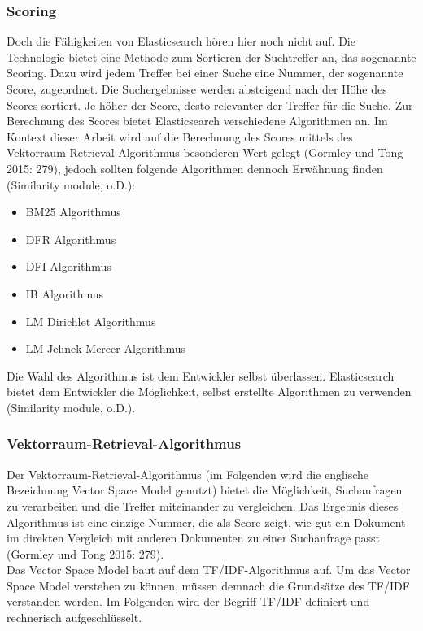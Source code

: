 \documentclass[a4paper]{scrartcl}
\begin{document}
\subsubsection{Scoring}
Doch die Fähigkeiten von Elasticsearch hören hier noch nicht auf. Die Technologie bietet eine Methode zum Sortieren der Suchtreffer an, das sogenannte Scoring. Dazu wird jedem Treffer bei einer Suche eine Nummer, der sogenannte Score, zugeordnet. Die Suchergebnisse werden absteigend nach der Höhe des Scores sortiert. Je höher der Score, desto relevanter der Treffer für die Suche. Zur Berechnung des Scores bietet Elasticsearch verschiedene Algorithmen an. Im Kontext dieser Arbeit wird auf die Berechnung des Scores mittels des Vektorraum-Retrieval-Algorithmus besonderen Wert gelegt (Gormley und Tong 2015: 279), jedoch sollten folgende Algorithmen dennoch Erwähnung finden (Similarity module, o.D.):

\begin{itemize}
	\item BM25 Algorithmus
	\item DFR Algorithmus
	\item DFI Algorithmus
	\item IB Algorithmus
	\item LM Dirichlet Algorithmus
	\item LM Jelinek Mercer Algorithmus
\end{itemize}

Die Wahl des Algorithmus ist dem Entwickler selbst überlassen. Elasticsearch bietet dem Entwickler die Möglichkeit, selbst erstellte Algorithmen zu verwenden (Similarity module, o.D.).

\subsubsection{Vektorraum-Retrieval-Algorithmus}
Der Vektorraum-Retrieval-Algorithmus (im Folgenden wird die englische Bezeichnung Vector Space Model genutzt) bietet die Möglichkeit, Suchanfragen zu verarbeiten und die Treffer miteinander zu vergleichen. Das Ergebnis dieses Algorithmus ist eine einzige Nummer, die als Score zeigt, wie gut ein Dokument im direkten Vergleich mit anderen Dokumenten zu einer Suchanfrage passt (Gormley und Tong 2015: 279). \\

Das Vector Space Model baut auf dem TF/IDF-Algorithmus auf. Um das Vector Space Model verstehen zu können, müssen demnach die Grundsätze des TF/IDF verstanden werden. Im Folgenden wird der Begriff TF/IDF definiert und rechnerisch aufgeschlüsselt.
\end{document}
